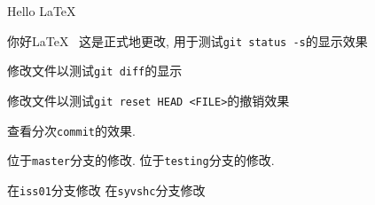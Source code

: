 \documentclass{ctexart}
\begin{document}
    Hello \LaTeX~

    你好\LaTeX~ %
    这是正式地更改, 用于测试\verb|git status -s|的显示效果

    修改文件以测试\verb|git diff|的显示

    修改文件以测试\verb|git reset HEAD <FILE>|的撤销效果

    查看分次\verb|commit|的效果. 

    位于\verb|master|分支的修改. 
    位于\verb|testing|分支的修改. 
    
    在\verb|iss01|分支修改
    在\verb|syvshc|分支修改
\end{document}
